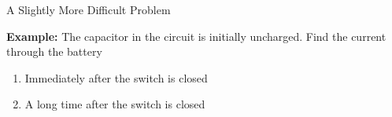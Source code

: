 \documentclass[12pt,aspectratio=169]{beamer}
\begin{document}
\begin{frame}{A Slightly More Difficult Problem}
  \begin{center}
  \end{center}
  \textbf{Example:} The capacitor in the circuit is initially uncharged. Find
  the current through the battery
  \begin{enumerate}
  \item Immediately after the switch is closed
  \item A long time after the switch is closed
  \end{enumerate}
\end{frame}
\end{document}
